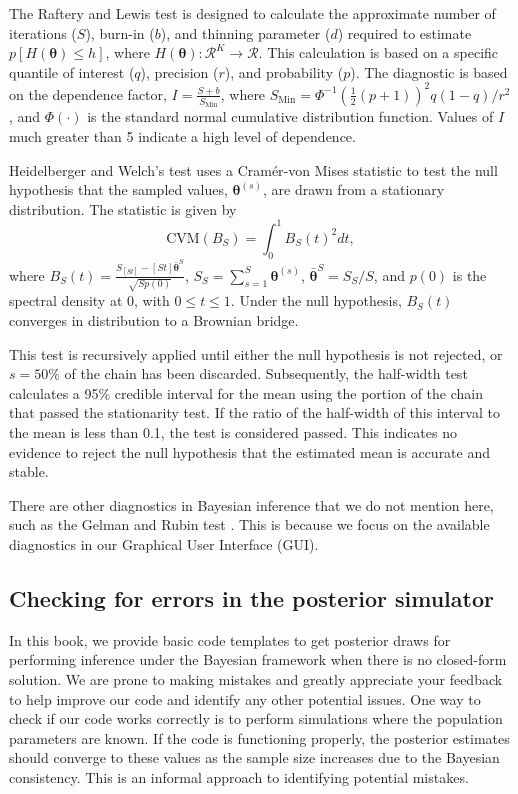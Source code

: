 The Raftery and Lewis test \cite{Raftery1992} is designed to calculate the approximate number of iterations ($S$), burn-in ($b$), and thinning parameter ($d$) required to estimate $p\left[H(\bm{\theta}) \leq h\right]$, where $H(\bm{\theta}): \mathcal{R}^K \rightarrow \mathcal{R}$. This calculation is based on a specific quantile of interest ($q$), precision ($r$), and probability ($p$). The diagnostic is based on the dependence factor, $I = \frac{S + b}{S_{\text{Min}}}$, where $S_{\text{Min}} = \Phi^{-1}\left(\frac{1}{2}(p+1)\right)^2 q(1-q) / r^2$, and $\Phi(\cdot)$ is the standard normal cumulative distribution function. Values of $I$ much greater than 5 indicate a high level of dependence.

Heidelberger and Welch's test \cite{Heidelberger1983} uses a Cramér-von Mises statistic to test the null hypothesis that the sampled values, $\bm{\theta}^{(s)}$, are drawn from a stationary distribution. The statistic is given by 
\[
\text{CVM}(B_S) = \int_0^1 B_S(t)^2 dt,
\]
where $B_S(t) = \frac{S_{\left[St\right]} - \left[St\right] \bar{\bm{\theta}}^S}{\sqrt{S p(0)}}$, $S_S = \sum_{s=1}^S \bm{\theta}^{(s)}$, $\bar{\bm{\theta}}^S = S_S / S$, and $p(0)$ is the spectral density at 0, with $0 \leq t \leq 1$. Under the null hypothesis, $B_S(t)$ converges in distribution to a Brownian bridge.

This test is recursively applied until either the null hypothesis is not rejected, or $s = 50\%$ of the chain has been discarded. Subsequently, the half-width test calculates a 95\% credible interval for the mean using the portion of the chain that passed the stationarity test. If the ratio of the half-width of this interval to the mean is less than 0.1, the test is considered passed. This indicates no evidence to reject the null hypothesis that the estimated mean is accurate and stable.

There are other diagnostics in Bayesian inference that we do not mention here, such as the Gelman and Rubin test \cite{Gelman1992}. This is because we focus on the available diagnostics in our Graphical User Interface (GUI).

\subsection{Checking for errors in the posterior simulator}

In this book, we provide basic code templates to get posterior draws for performing inference under the Bayesian framework when there is no closed-form solution. We are prone to making mistakes and greatly appreciate your feedback to help improve our code and identify any other potential issues. One way to check if our code works correctly is to perform simulations where the population parameters are known. If the code is functioning properly, the posterior estimates should converge to these values as the sample size increases due to the Bayesian consistency. This is an informal approach to identifying potential mistakes.

